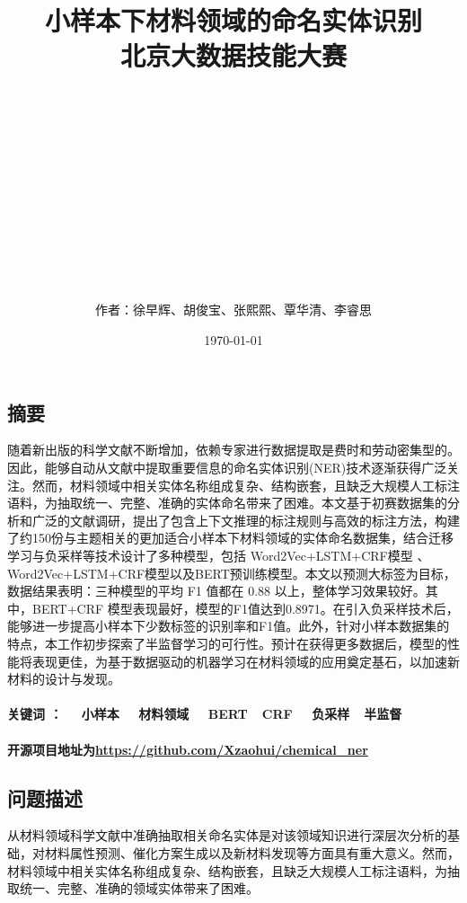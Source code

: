 \documentclass{article}
\title{小样本下材料领域的命名实体识别\\ {\small 北京大数据技能大赛}}
\author{\\\\\\\\\\\\\\\\\\\\\\\\作者：徐早辉、胡俊宝、张熙熙、覃华清、李睿思}
\date{\today}
\begin{document}
	\maketitle
	\newpage
	\begin{center}
		\tableofcontents
	\end{center}
	
	\newpage
	\begin{center}
		\section{摘要}
	\end{center}
	
	随着新出版的科学文献不断增加，依赖专家进行数据提取是费时和劳动密集型的。因此，能够自动从文献中提取重要信息的命名实体识别(NER)技术逐渐获得广泛关注。然而，材料领域中相关实体名称组成复杂、结构嵌套，且缺乏大规模人工标注语料，为抽取统一、完整、准确的实体命名带来了困难。本文基于初赛数据集的分析和广泛的文献调研，提出了包含上下文推理的标注规则与高效的标注方法，构建了约150份与主题相关的更加适合小样本下材料领域的实体命名数据集，结合迁移学习与负采样等技术设计了多种模型，包括 Word2Vec+LSTM+CRF模型 、 Word2Vec+LSTM+CRF模型以及BERT预训练模型。本文以预测大标签为目标，数据结果表明：三种模型的平均 F1 值都在 0.88 以上，整体学习效果较好。其中，BERT+CRF 模型表现最好，模型的F1值达到0.8971。在引入负采样技术后，能够进一步提高小样本下少数标签的识别率和F1值。此外，针对小样本数据集的特点，本工作初步探索了半监督学习的可行性。预计在获得更多数据后，模型的性能将表现更佳，为基于数据驱动的机器学习在材料领域的应用奠定基石，以加速新材料的设计与发现。
\paragraph{关键词 ： ~~小样本 ~~材料领域  ~~BERT~~CRF ~~负采样~~半监督}
	
\paragraph{开源项目地址为\url{https://github.com/Xzaohui/chemical_ner}}
	\newpage
	\begin{center}
		\section{问题描述}
	\end{center}
	
	
	从材料领域科学文献中准确抽取相关命名实体是对该领域知识进行深层次分析的基础，对材料属性预测、催化方案生成以及新材料发现等方面具有重大意义。然而，材料领域中相关实体名称组成复杂、结构嵌套，且缺乏大规模人工标注语料，为抽取统一、完整、准确的领域实体带来了困难。
	
\end{document}
